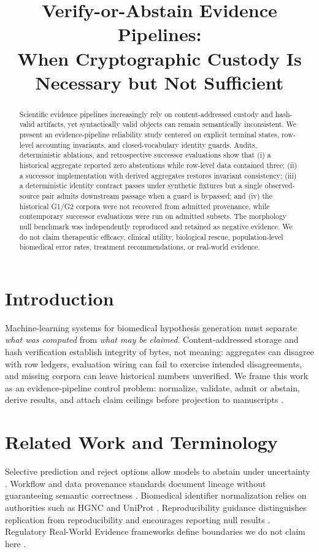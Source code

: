 \documentclass{article}
\title{Verify-or-Abstain Evidence Pipelines:\\When Cryptographic Custody Is Necessary but Not Sufficient}
\begin{document}
\maketitle

\begin{abstract}
Scientific evidence pipelines increasingly rely on content-addressed custody and hash-valid artifacts, yet syntactically valid objects can remain semantically inconsistent. We present an evidence-pipeline reliability study centered on explicit terminal states, row-level accounting invariants, and closed-vocabulary identity guards. Audits, deterministic ablations, and retrospective successor evaluations show that (i) a historical aggregate reported zero abstentions while row-level data contained three; (ii) a successor implementation with derived aggregates restores invariant consistency; (iii) a deterministic identity contract passes under synthetic fixtures but a single observed-source pair admits downstream passage when a guard is bypassed; and (iv) the historical G1/G2 corpora were not recovered from admitted provenance, while contemporary successor evaluations were run on admitted subsets. The morphology null benchmark was independently reproduced and retained as negative evidence. We do not claim therapeutic efficacy, clinical utility, biological rescue, population-level biomedical error rates, treatment recommendations, or real-world evidence.
\end{abstract}

\section{Introduction}
Machine-learning systems for biomedical hypothesis generation must separate \emph{what was computed} from \emph{what may be claimed}. Content-addressed storage and hash verification establish integrity of bytes, not meaning: aggregates can disagree with row ledgers, evaluation wiring can fail to exercise intended disagreements, and missing corpora can leave historical numbers unverified. We frame this work as an evidence-pipeline control problem: normalize, validate, admit or abstain, derive results, and attach claim ceilings before projection to manuscripts \cite{prov_dm,stodden2016}.

\section{Related Work and Terminology}
Selective prediction and reject options allow models to abstain under uncertainty \cite{chow1970,geifman2017}. Workflow and data provenance standards document lineage without guaranteeing semantic correctness \cite{prov_dm}. Biomedical identifier normalization relies on authorities such as HGNC and UniProt \cite{hgnc2021,uniprot2023}. Reproducibility guidance distinguishes replication from reproducibility and encourages reporting null results \cite{nas2019}. Regulatory Real-World Evidence frameworks define boundaries we do not claim here \cite{fda_rwe}.
\end{document}
